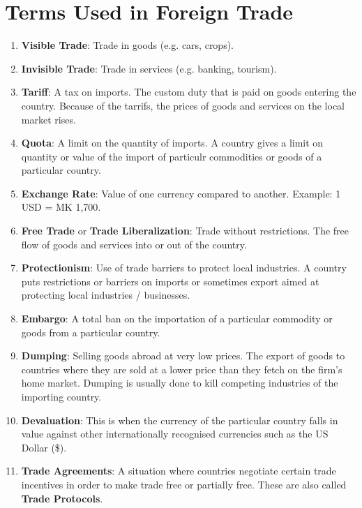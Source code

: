 \documentclass[14pt,a4paper, openany]{book}
\begin{document}
\section{Terms Used in Foreign Trade}
\begin{enumerate}
	\item \textbf{Visible Trade}: Trade in goods (e.g. cars, crops).
	\item \textbf{Invisible Trade}: Trade in services (e.g. banking, tourism).
	\item \textbf{Tariff}: A tax on imports. The custom duty that is paid on goods
	      entering the country. Because of the tarrifs, the prices of goods and services
	      on the local market rises.
	\item \textbf{Quota}: A limit on the quantity of imports. A country gives a limit
	      on quantity or value of the import of particulr commodities or goods of a particular
	      country.
	\item \textbf{Exchange Rate}: Value of one currency compared to another.
	      Example: 1 USD = MK 1,700.
	\item \textbf{Free Trade} or \textbf{Trade Liberalization}: Trade without restrictions. The
	      free flow of goods and services into or out of the country.
	\item \textbf{Protectionism}: Use of trade barriers to protect local industries.
	      A country puts restrictions or barriers on imports or sometimes export aimed at
	      protecting local industries / businesses.
	\item \textbf{Embargo}: A total ban on the importation of a particular commodity or goods from
	      a particular country.
	\item \textbf{Dumping}: Selling goods abroad at very low prices. The export of goods to countries where
	      they are sold at a lower price than they fetch on the firm's home market. Dumping is usually done to kill
	      competing industries of the importing country.
	\item \textbf{Devaluation}: This is when the currency of the particular country falls in value
	      against other internationally recognised currencies such as the US Dollar (\$).
	\item \textbf{Trade Agreements}: A situation where countries negotiate certain trade incentives in order to make
	      trade free or partially free. These are also called \textbf{Trade Protocols}.
\end{enumerate}
\end{document}
